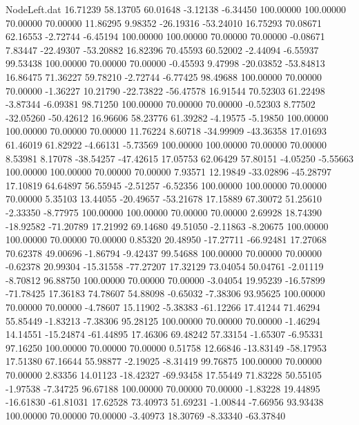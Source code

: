 \begin{filecontents}{NodeLeft.dat}
  16.71239   58.13705   60.01648    -3.12138   -6.34450  100.00000  100.00000   70.00000   70.00000   11.86295    9.98352  -26.19316  -53.24010
  16.75293   70.08671   62.16553    -2.72744   -6.45194  100.00000  100.00000   70.00000   70.00000   -0.08671    7.83447  -22.49307  -53.20882
  16.82396   70.45593   60.52002    -2.44094   -6.55937   99.53438  100.00000   70.00000   70.00000   -0.45593    9.47998  -20.03852  -53.84813
  16.86475   71.36227   59.78210    -2.72744   -6.77425   98.49688  100.00000   70.00000   70.00000   -1.36227   10.21790  -22.73822  -56.47578
  16.91544   70.52303   61.22498    -3.87344   -6.09381   98.71250  100.00000   70.00000   70.00000   -0.52303    8.77502  -32.05260  -50.42612
  16.96606   58.23776   61.39282    -4.19575   -5.19850  100.00000  100.00000   70.00000   70.00000   11.76224    8.60718  -34.99909  -43.36358
  17.01693   61.46019   61.82922    -4.66131   -5.73569  100.00000  100.00000   70.00000   70.00000    8.53981    8.17078  -38.54257  -47.42615
  17.05753   62.06429   57.80151    -4.05250   -5.55663  100.00000  100.00000   70.00000   70.00000    7.93571   12.19849  -33.02896  -45.28797
  17.10819   64.64897   56.55945    -2.51257   -6.52356  100.00000  100.00000   70.00000   70.00000    5.35103   13.44055  -20.49657  -53.21678
  17.15889   67.30072   51.25610    -2.33350   -8.77975  100.00000  100.00000   70.00000   70.00000    2.69928   18.74390  -18.92582  -71.20789
  17.21992   69.14680   49.51050    -2.11863   -8.20675  100.00000  100.00000   70.00000   70.00000    0.85320   20.48950  -17.27711  -66.92481
  17.27068   70.62378   49.00696    -1.86794   -9.42437   99.54688  100.00000   70.00000   70.00000   -0.62378   20.99304  -15.31558  -77.27207
  17.32129   73.04054   50.04761    -2.01119   -8.70812   96.88750  100.00000   70.00000   70.00000   -3.04054   19.95239  -16.57899  -71.78425
  17.36183   74.78607   54.88098    -0.65032   -7.38306   93.95625  100.00000   70.00000   70.00000   -4.78607   15.11902   -5.38383  -61.12266
  17.41244   71.46294   55.85449    -1.83213   -7.38306   95.28125  100.00000   70.00000   70.00000   -1.46294   14.14551  -15.24874  -61.44895
  17.46306   69.48242   57.33154    -1.65307   -6.95331   97.16250  100.00000   70.00000   70.00000    0.51758   12.66846  -13.83149  -58.17953
  17.51380   67.16644   55.98877    -2.19025   -8.31419   99.76875  100.00000   70.00000   70.00000    2.83356   14.01123  -18.42327  -69.93458
  17.55449   71.83228   50.55105    -1.97538   -7.34725   96.67188  100.00000   70.00000   70.00000   -1.83228   19.44895  -16.61830  -61.81031
  17.62528   73.40973   51.69231    -1.00844   -7.66956   93.93438  100.00000   70.00000   70.00000   -3.40973   18.30769   -8.33340  -63.37840

\end{filecontents}
